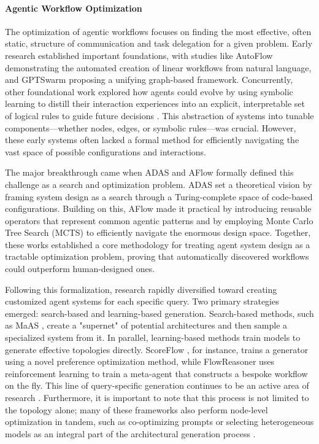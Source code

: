\paragraph{Agentic Workflow Optimization}

The optimization of agentic workflows focuses on finding the most effective, often static, structure of communication and task delegation for a given problem. Early research established important foundations, with studies like AutoFlow \citep{li2024autoflow} demonstrating the automated creation of linear workflows from natural language, and GPTSwarm \citep{zhuge2024gptswarm} proposing a unifying graph-based framework. Concurrently, other foundational work explored how agents could evolve by using symbolic learning to distill their interaction experiences into an explicit, interpretable set of logical rules to guide future decisions \citep{zhou2024symbolic}. This abstraction of systems into tunable components—whether nodes, edges, or symbolic rules—was crucial. However, these early systems often lacked a formal method for efficiently navigating the vast space of possible configurations and interactions.

The major breakthrough came when ADAS \citep{hu2024automated} and AFlow \citep{zhang2024aflow} formally defined this challenge as a search and optimization problem. ADAS set a theoretical vision by framing system design as a search through a Turing-complete space of code-based configurations. Building on this, AFlow made it practical by introducing reusable operators that represent common agentic patterns and by employing Monte Carlo Tree Search (MCTS) to efficiently navigate the enormous design space.
Together, these works established a core methodology for treating agent system design as a tractable optimization problem, proving that automatically discovered workflows could outperform human-designed ones.

Following this formalization, research rapidly diversified toward creating customized agent systems for each specific query. Two primary strategies emerged: search-based and learning-based generation. Search-based methods, such as MaAS \citep{zhang2025maas}, create a "supernet" of potential architectures and then sample a specialized system from it. In parallel, learning-based methods train models to generate effective topologies directly. ScoreFlow \citep{wang2025scoreflow}, for instance, trains a generator using a novel preference optimization method, while FlowReasoner \citep{gao2025flowreasoner} uses reinforcement learning to train a meta-agent that constructs a bespoke workflow on the fly. This line of query-specific generation continues to be an active area of research \citep{ye2025masgpt, ke2025maszero}. Furthermore, it is important to note that this process is not limited to the topology alone; many of these frameworks also perform node-level optimization in tandem, such as co-optimizing prompts or selecting heterogeneous models as an integral part of the architectural generation process \citep{zhang2024aflow, zhou2025maasprompt, zhang2025evoflow}.

